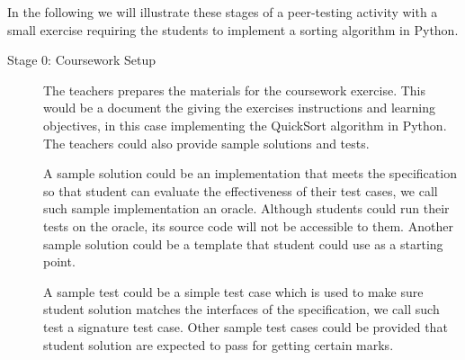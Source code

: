 \documentclass[sigplan,10pt,review]{acmart}\settopmatter{printfolios=true}
\begin{document}
In the following we will illustrate these stages of a peer-testing
activity with a small exercise requiring the students to implement a
sorting algorithm in Python.
\begin{description}
\item[Stage 0: Coursework Setup] The teachers prepares the materials
  for the coursework exercise. This would be a document the giving the
  exercises instructions and learning objectives, in this case
  implementing the QuickSort algorithm in Python. The teachers could
  also provide sample solutions and tests.

  A sample solution could be an implementation that meets the
  specification so that student can evaluate the effectiveness of
  their test cases, we call such sample implementation an
  oracle. Although students could run their tests on the oracle, its
  source code will not be accessible to them. Another sample solution
  could be a template that student could use as a starting point.

  A sample test could be a simple test case which is used to make sure
  student solution matches the interfaces of the specification, we
  call such test a signature test case. Other sample test cases could
  be provided that student solution are expected to pass for getting
  certain marks.


\end{description}
\end{document}
